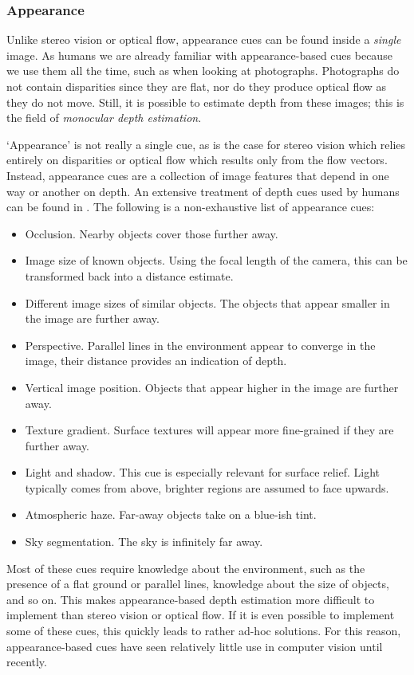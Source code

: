 \subsubsection{Appearance}
\label{sec:appearance}
Unlike stereo vision or optical flow, appearance cues can be found inside a \emph{single} image.
As humans we are already familiar with appearance-based cues because we use them all the time, such as when looking at photographs.
Photographs do not contain disparities since they are flat, nor do they produce optical flow as they do not move.
Still, it is possible to estimate depth from these images; this is the field of \emph{monocular depth estimation}.

`Appearance' is not really a single cue, as is the case for stereo vision which relies entirely on disparities or optical flow which results only from the flow vectors.
Instead, appearance cues are a collection of image features that depend in one way or another on depth.
An extensive treatment of depth cues used by humans can be found in \cite{Gibson1950}.
The following is a non-exhaustive list of appearance cues:
\begin{itemize}
\item Occlusion. Nearby objects cover those further away.
\item Image size of known objects. Using the focal length of the camera, this can be transformed back into a distance estimate.
\item Different image sizes of similar objects. The objects that appear smaller in the image are further away.
\item Perspective. Parallel lines in the environment appear to converge in the image, their distance provides an indication of depth.
\item Vertical image position. Objects that appear higher in the image are further away.
\item Texture gradient. Surface textures will appear more fine-grained if they are further away.
\item Light and shadow. This cue is especially relevant for surface relief. Light typically comes from above, brighter regions are assumed to face upwards.
\item Atmospheric haze. Far-away objects take on a blue-ish tint.
\item Sky segmentation. The sky is infinitely far away.
\end{itemize}
Most of these cues require knowledge about the environment, such as the presence of a flat ground or parallel lines, knowledge about the size of objects, and so on.
This makes appearance-based depth estimation more difficult to implement than stereo vision or optical flow.
If it is even possible to implement some of these cues, this quickly leads to rather ad-hoc solutions.
For this reason, appearance-based cues have seen relatively little use in computer vision until recently.

